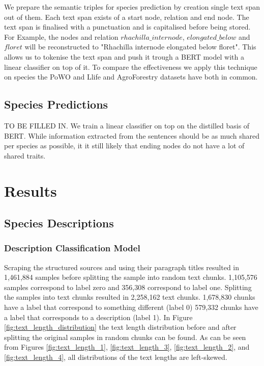 \documentclass[a4paper, 12pt, oneside]{book} %
\begin{document}
We prepare the semantic triples for species prediction by creation single text span out of them.
Each text span exists of a start node, relation and end node.
The text span is finalised with a punctuation and is capitalised before being stored.
For Example, the nodes and relation $rhachilla\_internode$, $elongated\_below$ and $floret$ will be reconstructed to "Rhachilla internode elongated below floret".
This allows us to tokenise the text span and push it trough a BERT model with a linear classifier on top of it.
To compare the effectiveness we apply this technique on species the PoWO and Llife  and AgroForestry datasets have both in common. %



\subsection{Species Predictions}
TO BE FILLED IN.
We train a linear classifier on top on the distilled basis of BERT.
While information extracted from the sentences should be as much shared per species as possible, it it still likely that ending nodes do not have a lot of shared traits.

\newpage
\section{Results} \label{par:results}
\subsection{Species Descriptions}
\subsubsection{Description Classification Model}
Scraping the structured sources and using their paragraph titles resulted in 1,461,884 samples before splitting the sample into random text chunks.
1,105,576 samples correspond to label zero and 356,308 correspond to label one.
Splitting the samples into text chunks resulted in 2,258,162 text chunks.
1,678,830 chunks have a label that correspond to something different (label 0) 579,332 chunks have a label that corresponds to a description (label 1).
In Figure \ref{fig:text_length_distribution} the text length distribution before and after splitting the original samples in random chunks can be found.
As can be seen from Figures \ref{fig:text_length_1}, \ref{fig:text_length_3}, \ref{fig:text_length_2}, and \ref{fig:text_length_4}, all distributions of the text lengths are left-skewed. 
\end{document}
